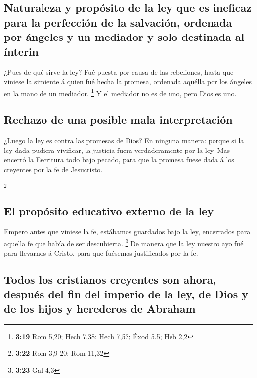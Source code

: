 \hypertarget{naturaleza-y-propuxf3sito-de-la-ley-que-es-ineficaz-para-la-perfecciuxf3n-de-la-salvaciuxf3n-ordenada-por-uxe1ngeles-y-un-mediador-y-solo-destinada-al-uxednterin}{%
\subsection{Naturaleza y propósito de la ley que es ineficaz para la
perfección de la salvación, ordenada por ángeles y un mediador y solo
destinada al
ínterin}\label{naturaleza-y-propuxf3sito-de-la-ley-que-es-ineficaz-para-la-perfecciuxf3n-de-la-salvaciuxf3n-ordenada-por-uxe1ngeles-y-un-mediador-y-solo-destinada-al-uxednterin}}

 ¿Pues de qué sirve la ley? Fué puesta por causa de las
rebeliones, hasta que viniese la simiente á quien fué hecha la promesa,
ordenada aquélla por los ángeles en la mano de un mediador. \footnote{\textbf{3:19}
  Rom 5,20; Hech 7,38; Hech 7,53; Éxod 5,5; Heb 2,2}  Y
el mediador no es de uno, pero Dios es uno.

\hypertarget{rechazo-de-una-posible-mala-interpretaciuxf3n}{%
\subsection{Rechazo de una posible mala
interpretación}\label{rechazo-de-una-posible-mala-interpretaciuxf3n}}

 ¿Luego la ley es contra las promesas de Dios? En ninguna
manera: porque si la ley dada pudiera vivificar, la justicia fuera
verdaderamente por la ley.  Mas encerró la Escritura todo
bajo pecado, para que la promesa fuese dada á los creyentes por la fe de
Jesucristo.

\footnote{\textbf{3:22} Rom 3,9-20; Rom 11,32}

\hypertarget{el-propuxf3sito-educativo-externo-de-la-ley}{%
\subsection{El propósito educativo externo de la
ley}\label{el-propuxf3sito-educativo-externo-de-la-ley}}

 Empero antes que viniese la fe, estábamos guardados bajo
la ley, encerrados para aquella fe que había de ser descubierta.
\footnote{\textbf{3:23} Gal 4,3}  De manera que la ley
nuestro ayo fué para llevarnos á Cristo, para que fuésemos justificados
por la fe.

\hypertarget{todos-los-cristianos-creyentes-son-ahora-despuuxe9s-del-fin-del-imperio-de-la-ley-de-dios-y-de-los-hijos-y-herederos-de-abraham}{%
\subsection{Todos los cristianos creyentes son ahora, después del fin
del imperio de la ley, de Dios y de los hijos y herederos de
Abraham}\label{todos-los-cristianos-creyentes-son-ahora-despuuxe9s-del-fin-del-imperio-de-la-ley-de-dios-y-de-los-hijos-y-herederos-de-abraham}}

